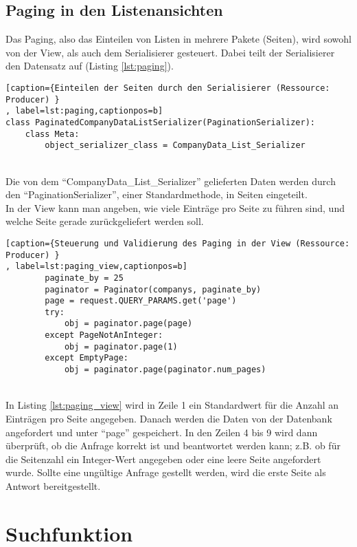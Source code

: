 \subsection{Paging in den Listenansichten}
\label{sec:paging}

Das Paging, also das Einteilen von Listen in mehrere Pakete (Seiten), wird
sowohl von der View, als auch dem Serialisierer gesteuert. Dabei teilt der
Serialisierer den Datensatz auf (Listing \ref{lst:paging}).
\begin{lstlisting}[caption={Einteilen der Seiten durch den Serialisierer (Ressource: Producer) }
, label=lst:paging,captionpos=b]
class PaginatedCompanyDataListSerializer(PaginationSerializer):
    class Meta:
        object_serializer_class = CompanyData_List_Serializer
\end{lstlisting}
\\
Die von dem "`CompanyData\_List\_Serializer"' gelieferten Daten werden durch
den "`PaginationSerializer"', einer Standardmethode, in Seiten eingeteilt.
\\
In der View kann man angeben, wie viele Einträge pro Seite zu führen sind, und
welche Seite gerade zurückgeliefert werden soll.
\begin{lstlisting}[caption={Steuerung und Validierung des Paging in der View (Ressource: Producer) }
, label=lst:paging_view,captionpos=b]
        paginate_by = 25
        paginator = Paginator(companys, paginate_by)
        page = request.QUERY_PARAMS.get('page')
        try:
            obj = paginator.page(page)
        except PageNotAnInteger:
            obj = paginator.page(1)
        except EmptyPage:
            obj = paginator.page(paginator.num_pages)
\end{lstlisting}
\\
In Listing \ref{lst:paging_view} wird in Zeile 1 ein Standardwert für die
Anzahl an Einträgen pro Seite angegeben. Danach werden die Daten von der
Datenbank angefordert und unter "`page"' gespeichert. In den Zeilen 4 bis 9 wird
dann überprüft, ob die Anfrage korrekt ist und beantwortet werden kann; z.B. ob
für die Seitenzahl ein Integer-Wert angegeben oder eine leere Seite
angefordert wurde. Sollte eine ungültige Anfrage gestellt werden, wird die erste
Seite als Antwort bereitgestellt.

\section{Suchfunktion}
\label{sec:Suchfunktion_rel}

